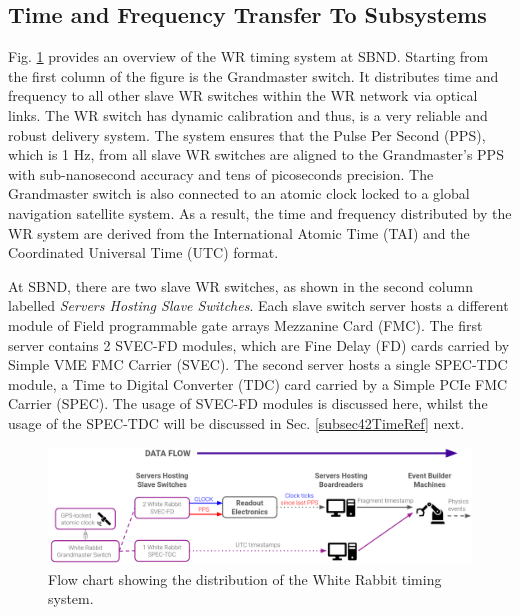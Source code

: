 

\subsection{Time and Frequency Transfer To Subsystems}
\label{subsec41TimeRef}

Fig. \ref{fig:timeTransfer} provides an overview of the WR timing system at SBND.
Starting from the first column of the figure is the Grandmaster switch.
It distributes time and frequency to all other slave WR switches within the WR network via optical links.
The WR switch has dynamic calibration and thus, is a very reliable and robust delivery system.
The system ensures that the Pulse Per Second (PPS), which is 1 Hz, from all slave WR switches are aligned to the Grandmaster's PPS with sub-nanosecond accuracy and tens of picoseconds precision.
The Grandmaster switch is also connected to an atomic clock locked to a global navigation satellite system.
As a result, the time and frequency distributed by the WR system are derived from the International Atomic Time (TAI) and the Coordinated Universal Time (UTC) format.

At SBND, there are two slave WR switches, as shown in the second column labelled \textit{Servers Hosting Slave Switches}.
Each slave switch server hosts a different module of Field programmable gate arrays Mezzanine Card (FMC).
The first server contains 2 SVEC-FD modules, which are Fine Delay (FD) cards carried by Simple VME FMC Carrier (SVEC).
The second server hosts a single SPEC-TDC module, a Time to Digital Converter (TDC) card carried by a Simple PCIe FMC Carrier (SPEC).
The usage of SVEC-FD modules is discussed here, whilst the usage of the SPEC-TDC will be discussed in Sec. \ref{subsec42TimeRef} next.

\begin{figure}[ht!] 
\centering    
\includegraphics[width=1.0\textwidth]{time_transfer}
\caption[White Rabbit Timing System Flow Chart]{
Flow chart showing the distribution of the White Rabbit timing system.
}
\label{fig:timeTransfer}
\end{figure}

